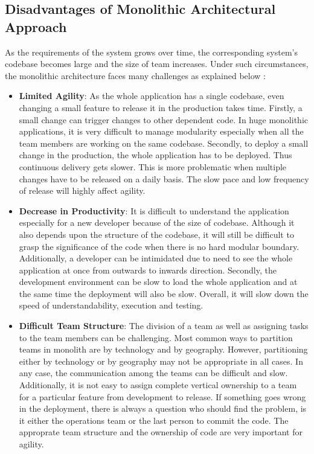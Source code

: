 \subsection{Disadvantages of Monolithic Architectural Approach}\label{subsection:context/monolith-disadvantages}
As the requirements of the system grows over time, the corresponding system's codebase becomes large and the size of team increases. Under such circumstances, the monolithic architecture faces many challenges as explained below \cite{Namiot:2014aa} \cite{Newman:2015aa}\cite{Abram:2014aa} \cite{Richardson:2014aa} \cite{Richardson:2014ab} \cite{Gupta:2015aa} :
\begin{itemize}[leftmargin=.5in]
\item \textbf{Limited Agility}: As the whole application has a single codebase, even changing a small feature to release it in the production takes time. Firstly, a small change can trigger changes to other dependent code. In huge monolithic applications, it is very difficult to manage modularity especially when all the team members are working on the same codebase. Secondly, to deploy a small change in the production, the whole application has to be deployed. Thus continuous delivery gets slower. This is more problematic when multiple changes have to be released on a daily basis. The slow pace and low frequency of release will highly affect agility.
\\
\item \textbf{Decrease in Productivity}: It is difficult to understand the application especially for a new developer because of the size of codebase. Although it also depends upon the structure of the codebase, it will still be difficult to grasp the significance of the code when there is no hard modular boundary. Additionally, a developer can be intimidated due to need to see the whole application at once from outwards to inwards direction. Secondly, the development environment can be slow to load the whole application and at the same time the deployment will also be slow. Overall, it will slow down the speed of understandability, execution and testing.
\\
\item \textbf{Difficult Team Structure}: The division of a team as well as assigning tasks to the team members can be challenging. Most common ways to partition teams in monolith are by technology and by geography. However, partitioning either by technology or by geography may not be appropriate in all cases. In any case, the communication among the teams can be difficult and slow. Additionally, it is not easy to assign complete vertical ownership to a team for a particular feature from development to release. If something goes wrong in the deployment, there is always a question who should find the problem, is it either the operations team or the last person to commit the code. The approprate team structure and the ownership of code are very important for agility.

\end{itemize}
